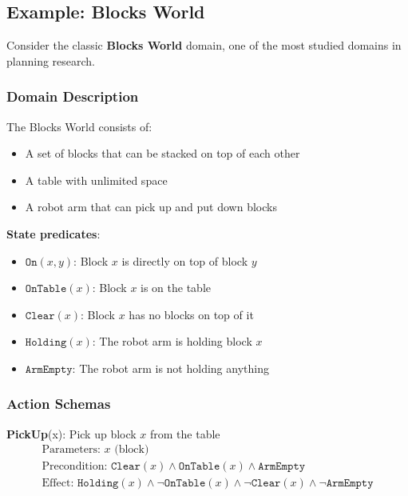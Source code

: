 \documentclass[11pt,a4paper]{article}
\theoremstyle{definition}
\theoremstyle{plain}
\theoremstyle{remark}
\begin{document}
\newpage

\subsection{Example: Blocks World}

Consider the classic \textbf{Blocks World} domain, one of the most studied domains in planning research.

\subsubsection{Domain Description}

The Blocks World consists of:
\begin{itemize}
    \item A set of blocks that can be stacked on top of each other
    \item A table with unlimited space
    \item A robot arm that can pick up and put down blocks
\end{itemize}

\begin{tcolorbox}[colback=purple!5!white,colframe=purple!75!black,title=\textbf{Blocks World State Representation}]
\textbf{State predicates}:
\begin{itemize}
    \item $\texttt{On}(x, y)$: Block $x$ is directly on top of block $y$
    \item $\texttt{OnTable}(x)$: Block $x$ is on the table
    \item $\texttt{Clear}(x)$: Block $x$ has no blocks on top of it
    \item $\texttt{Holding}(x)$: The robot arm is holding block $x$
    \item $\texttt{ArmEmpty}$: The robot arm is not holding anything
\end{itemize}
\end{tcolorbox}

\subsubsection{Action Schemas}

\textbf{PickUp}(x): Pick up block $x$ from the table
\[
\begin{array}{l}
\text{Parameters: } x \text{ (block)} \\
\text{Precondition: } \texttt{Clear}(x) \land \texttt{OnTable}(x) \land \texttt{ArmEmpty} \\
\text{Effect: } \texttt{Holding}(x) \land \neg \texttt{OnTable}(x) \land \neg \texttt{Clear}(x) \land \neg \texttt{ArmEmpty}
\end{array}
\]
\end{document}
